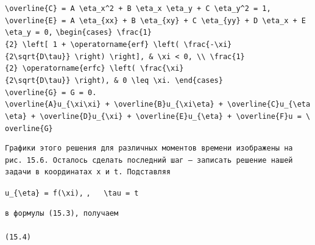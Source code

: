 \documentclass[
  ukrainian,
]{article}
\begin{document}
\texttt{\textbackslash{}overline\{C\}\ =\ A\ \textbackslash{}eta\_x\^{}2\ +\ B\ \textbackslash{}eta\_x\ \textbackslash{}eta\_y\ +\ C\ \textbackslash{}eta\_y\^{}2\ =\ 1,}
\texttt{\textbackslash{}overline\{E\}\ =\ A\ \textbackslash{}eta\_\{xx\}\ +\ B\ \textbackslash{}eta\_\{xy\}\ +\ C\ \textbackslash{}eta\_\{yy\}\ +\ D\ \textbackslash{}eta\_x\ +\ E\ \textbackslash{}eta\_y\ =\ 0,}
\texttt{\textbackslash{}begin\{cases\}\ \textbackslash{}frac\{1\}\{2\}\ \textbackslash{}left{[}\ 1\ +\ \textbackslash{}operatorname\{erf\}\ \textbackslash{}left(\ \textbackslash{}frac\{-\textbackslash{}xi\}\{2\textbackslash{}sqrt\{D\textbackslash{}tau\}\}\ \textbackslash{}right)\ \textbackslash{}right{]},\ \&\ \textbackslash{}xi\ \textless{}\ 0,\ \textbackslash{}\textbackslash{}\ \textbackslash{}frac\{1\}\{2\}\ \textbackslash{}operatorname\{erfc\}\ \textbackslash{}left(\ \textbackslash{}frac\{\textbackslash{}xi\}\{2\textbackslash{}sqrt\{D\textbackslash{}tau\}\}\ \textbackslash{}right),\ \&\ 0\ \textbackslash{}leq\ \textbackslash{}xi.\ \textbackslash{}end\{cases\}}
\texttt{\textbackslash{}overline\{G\}\ =\ G\ =\ 0.}
\texttt{\textbackslash{}overline\{A\}u\_\{\textbackslash{}xi\textbackslash{}xi\}\ +\ \textbackslash{}overline\{B\}u\_\{\textbackslash{}xi\textbackslash{}eta\}\ +\ \textbackslash{}overline\{C\}u\_\{\textbackslash{}eta\textbackslash{}eta\}\ +\ \textbackslash{}overline\{D\}u\_\{\textbackslash{}xi\}\ +\ \textbackslash{}overline\{E\}u\_\{\textbackslash{}eta\}\ +\ \textbackslash{}overline\{F\}u\ =\ \textbackslash{}overline\{G\}}

\begin{verbatim}
Графики этого решения для различных моментов времени изображены на рис. 15.6. Осталось сделать последний шаг — записать решение нашей задачи в координатах x и t. Подставляя
\end{verbatim}

\texttt{u\_\{\textbackslash{}eta\}\ =\ f(\textbackslash{}xi),}
\texttt{,\ \ \ \textbackslash{}tau\ =\ t}

\begin{verbatim}
в формулы (15.3), получаем

(15.4)
\end{verbatim}
\end{document}
